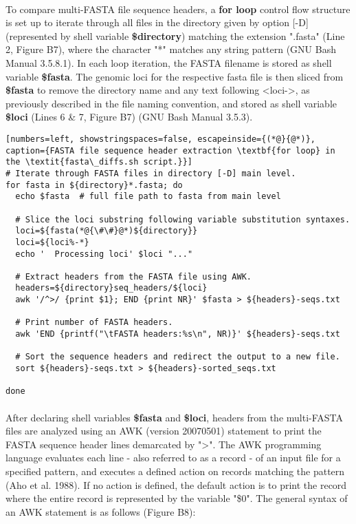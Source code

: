 \paragraph{}  To compare multi-FASTA file sequence headers, a \textbf{for loop} control flow structure is set up to iterate through all files in the directory given by option [-D] (represented by shell variable \textbf{\$directory}) matching the extension ".fasta" (Line 2, Figure B7), where the character "*" matches any string pattern (GNU Bash Manual 3.5.8.1).  In each loop iteration, the FASTA filename is stored as shell variable \textbf{\$fasta}.  The genomic loci for the respective fasta file is then sliced from \textbf{\$fasta} to remove the directory name and any text following <loci->, as previously described in the file naming convention, and stored as shell variable \textbf{\$loci} (Lines 6 \& 7, Figure B7) (GNU Bash Manual 3.5.3).

\vspace*{36pt}

\begin{lstlisting}[numbers=left, showstringspaces=false, escapeinside={(*@}{@*)}, caption={FASTA file sequence header extraction \textbf{for loop} in the \textit{fasta\_diffs.sh script.}}]
# Iterate through FASTA files in directory [-D] main level.
for fasta in ${directory}*.fasta; do
  echo $fasta  # full file path to fasta from main level
  
  # Slice the loci substring following variable substitution syntaxes.
  loci=${fasta(*@{\#\#}@*)${directory}}
  loci=${loci%-*}
  echo '  Processing loci' $loci "..."
  
  # Extract headers from the FASTA file using AWK.
  headers=${directory}seq_headers/${loci}
  awk '/^>/ {print $1}; END {print NR}' $fasta > ${headers}-seqs.txt
 
  # Print number of FASTA headers.
  awk 'END {printf("\tFASTA headers:%s\n", NR)}' ${headers}-seqs.txt

  # Sort the sequence headers and redirect the output to a new file.
  sort ${headers}-seqs.txt > ${headers}-sorted_seqs.txt
  
done

\end{lstlisting}

\clearpage

\paragraph{} After declaring shell variables \textbf{\$fasta} and \textbf{\$loci}, headers from the multi-FASTA files are analyzed using an AWK (version 20070501) statement to print the FASTA sequence header lines demarcated by ">".  The AWK programming language evaluates each line - also referred to as a record - of an input file for a specified pattern, and executes a defined action on records matching the pattern (Aho et al. 1988).  If no action is defined, the default action is to print the record where the entire record is represented by the variable "\$0".  The general syntax of an AWK statement is as follows (Figure B8):

